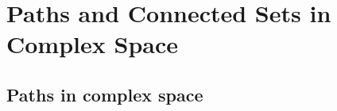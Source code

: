 \section{Paths and Connected Sets in Complex Space}


%
%
%
%
%
%
%
%
%
%
%


\subsection{Paths in complex space}

